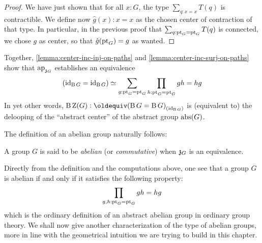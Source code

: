 \begin{proof}
  We have just shown that for all $x:G$, the type $\sum_{q:x=x}T(q)$
  is contractible. We define now $\hat g(x):x=x$ as the chosen center
  of contraction of that type. In particular, in the previous proof
  that $\sum_{q:\mathrm{pt}_G=\mathrm{pt}_G}T(q)$ is connected, we chose $g$ as
  center, so that $\hat g (\mathrm{pt}_G) = g$ as wanted.
\end{proof}

Together, \cref{lemma:center-inc-inj-on-paths} and
\cref{lemma:center-inc-surj-on-paths} show that $\mathop{\mathrm{ap}_{\mathfrak z_{{G}}}}$
establishes an equivalence
\begin{equation}
  \left( \mathord{\mathrm{id}}_{\operatorname{B} G} = \mathord{\mathrm{id}}_{\operatorname{B} G} \right) \simeq \sum_{g:\mathrm{pt}_G=\mathrm{pt}_G}\prod_{h:\mathrm{pt}_G=\mathrm{pt}_G}gh=hg
\end{equation}
In yet other words,
$\clf \grpcenter(G)\defequi \conncomp{(\clf G=\clf G)}{\id_{\clf G}}$ is
(equivalent to) the delooping of the ``abstract center'' of the
abstract group $\mathrm{abs}(G)$.

The definition of an abelian group naturally follows:
\begin{definition}
  \label{def:abelian-groups}%
  A group $G$ is said to be {\em abelian} (or {\em commutative}) when
  $\mathfrak z_{{G}}$ is an equivalence.
\end{definition}

Directly from the definition and the computations above, one see that
a group $G$ is abelian if and only if it satisfies the following
property:
\begin{displaymath}
  \prod_{g,h:\mathrm{pt}_G=\mathrm{pt}_G}gh=hg
\end{displaymath}
which is the ordinary definition of an abstract abelian group in
ordinary group theory. We shall now give another characterization of
the type of abelian groups, more in line with the geometrical
intuition we are trying to build in this chapter.

